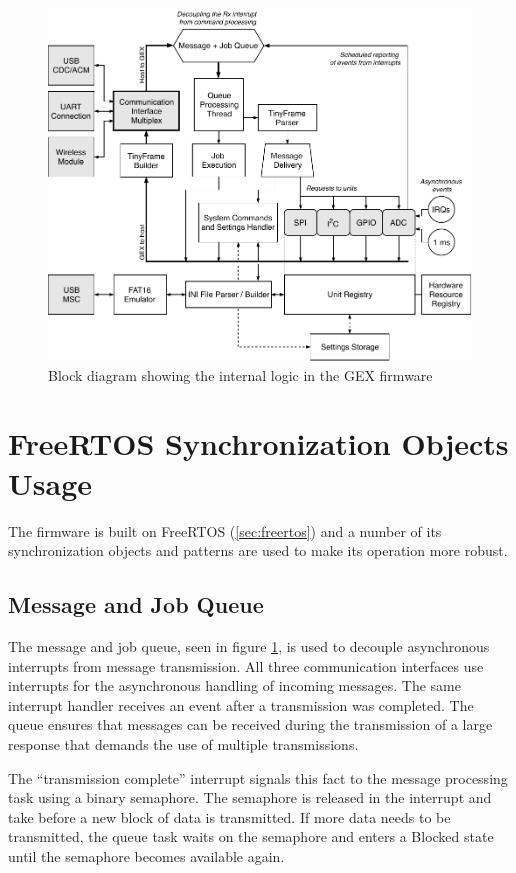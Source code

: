 \begin{figure}[h]
	\centering
	\includegraphics[scale=1] {img/gex-internal.pdf}
	\caption{\label{fig:gex-internal}Block diagram showing the internal logic in the GEX firmware}
\end{figure}

\section{FreeRTOS Synchronization Objects Usage}

The firmware is built on FreeRTOS (\ref{sec:freertos}) and a number of its synchronization objects and patterns are used to make its operation more robust.

\subsection{Message and Job Queue}

The message and job queue, seen in figure \ref{fig:gex-internal}, is used to decouple asynchronous interrupts from message transmission. All three communication interfaces use interrupts for the asynchronous handling of incoming messages. The same interrupt handler receives an event after a transmission was completed. The queue ensures that messages can be received during the transmission of a large response that demands the use of multiple transmissions.

The ``transmission complete'' interrupt signals this fact to the message processing task using a binary semaphore. The semaphore is released in the interrupt and take before a new block of data is transmitted. If more data needs to be transmitted, the queue task waits on the semaphore and enters a Blocked state until the semaphore becomes available again.

